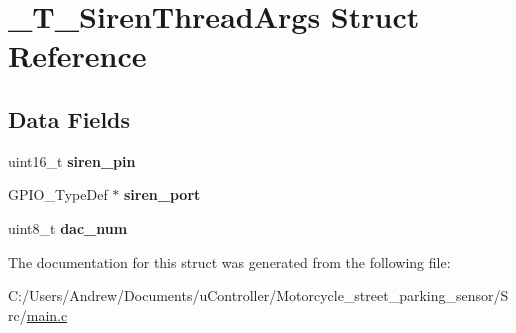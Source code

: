 \hypertarget{struct___t___siren_thread_args}{}\section{\+\_\+\+T\+\_\+\+Siren\+Thread\+Args Struct Reference}
\label{struct___t___siren_thread_args}
\subsection*{Data Fields}
\begin{DoxyCompactItemize}
\item 
\mbox{\label{struct___t___siren_thread_args_a119e97e1016289efc5b90d79cbe66178}} 
uint16\+\_\+t {\bfseries siren\+\_\+pin}
\item 
\mbox{\label{struct___t___siren_thread_args_a1cdd53c9ad1b8b8dbac547555afda4d3}} 
G\+P\+I\+O\+\_\+\+Type\+Def $\ast$ {\bfseries siren\+\_\+port}
\item 
\mbox{\label{struct___t___siren_thread_args_ac25d7b57cfbf93fa9bab434418d60756}} 
uint8\+\_\+t {\bfseries dac\+\_\+num}
\end{DoxyCompactItemize}


The documentation for this struct was generated from the following file\+:\begin{DoxyCompactItemize}
\item 
C\+:/\+Users/\+Andrew/\+Documents/u\+Controller/\+Motorcycle\+\_\+street\+\_\+parking\+\_\+sensor/\+Src/\mbox{\hyperlink{main_8c}{main.\+c}}\end{DoxyCompactItemize}
